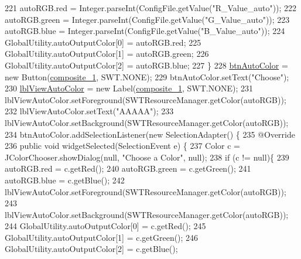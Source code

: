 \begin{DoxyCode}
221             autoRGB.red = Integer.parseInt(ConfigFile.getValue(\textcolor{stringliteral}{"R\_Value\_auto"}));
222             autoRGB.green = Integer.parseInt(ConfigFile.getValue(\textcolor{stringliteral}{"G\_Value\_auto"}));
223             autoRGB.blue = Integer.parseInt(ConfigFile.getValue(\textcolor{stringliteral}{"B\_Value\_auto"}));       
224             GlobalUtility.autoOutputColor[0] = autoRGB.red;
225             GlobalUtility.autoOutputColor[1] = autoRGB.green;
226             GlobalUtility.autoOutputColor[2] = autoRGB.blue;
227         \}
228         \hyperlink{classit_1_1isislab_1_1masonhelperdocumentation_1_1mason_1_1wizards_1_1_b___project_information_page_a60a4bbca5d0ee37acbc02b31f69db1bd}{btnAutoColor} = \textcolor{keyword}{new} Button(\hyperlink{classit_1_1isislab_1_1masonhelperdocumentation_1_1mason_1_1wizards_1_1_b___project_information_page_ad2438c6d59f23f0717a1503f4e823bb8}{composite\_1}, SWT.NONE);
229         btnAutoColor.setText(\textcolor{stringliteral}{"Choose"});
230         \hyperlink{classit_1_1isislab_1_1masonhelperdocumentation_1_1mason_1_1wizards_1_1_b___project_information_page_a649e641abf9319f5db69ccf3333fbf41}{lblViewAutoColor} = \textcolor{keyword}{new} Label(\hyperlink{classit_1_1isislab_1_1masonhelperdocumentation_1_1mason_1_1wizards_1_1_b___project_information_page_ad2438c6d59f23f0717a1503f4e823bb8}{composite\_1}, SWT.NONE);
231         lblViewAutoColor.setForeground(SWTResourceManager.getColor(autoRGB));
232         lblViewAutoColor.setText(\textcolor{stringliteral}{"AAAAA"});
233         lblViewAutoColor.setBackground(SWTResourceManager.getColor(autoRGB));
234         btnAutoColor.addSelectionListener(\textcolor{keyword}{new} SelectionAdapter() \{
235             @Override
236             \textcolor{keyword}{public} \textcolor{keywordtype}{void} widgetSelected(SelectionEvent e) \{
237                 Color c = JColorChooser.showDialog(null, \textcolor{stringliteral}{"Choose a Color"}, null);
238                   \textcolor{keywordflow}{if} (c != null)\{
239                       autoRGB.red = c.getRed();
240                       autoRGB.green = c.getGreen();
241                       autoRGB.blue = c.getBlue();
242                       lblViewAutoColor.setForeground(SWTResourceManager.getColor(autoRGB));
243                       lblViewAutoColor.setBackground(SWTResourceManager.getColor(autoRGB));
244                       GlobalUtility.autoOutputColor[0] = c.getRed();
245                       GlobalUtility.autoOutputColor[1] = c.getGreen();
246                       GlobalUtility.autoOutputColor[2] = c.getBlue();

\end{DoxyCode}
